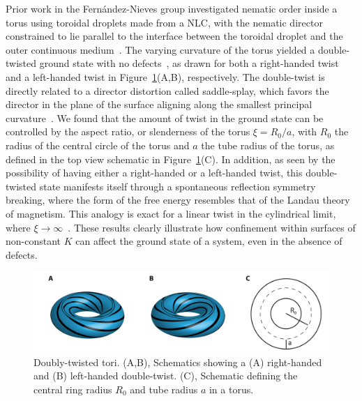Prior work in the Fern\'andez-Nieves group investigated nematic order inside a torus using toroidal droplets made from a NLC, with the nematic director constrained to lie parallel to the interface between the toroidal droplet and the outer continuous medium~\cite{RN24,RN47}.
The varying curvature of the torus yielded a double-twisted ground state with no defects~\cite{RN24}, as drawn for both a right-handed twist and a left-handed twist in Figure~\ref{f:1-Torus}(A,B), respectively.
The double-twist is directly related to a director distortion called saddle-splay, which favors the director in the plane of the surface aligning along the smallest principal curvature~\cite{RN59}.
We found that the amount of twist in the ground state can be controlled by the aspect ratio, or slenderness of the torus $\xi = R_0/a$, with $R_0$ the radius of the central circle of the torus and $a$ the tube radius of the torus, as defined in the top view schematic in Figure~\ref{f:1-Torus}(C).
In addition, as seen by the possibility of having either a right-handed or a left-handed twist, this double-twisted state manifests itself through a spontaneous reflection symmetry breaking, where the form of the free energy resembles that of the Landau theory of magnetism.
This analogy is exact for a linear twist in the cylindrical limit, where $\xi \rightarrow \infty$~\cite{RN293}.
These results clearly illustrate how confinement within surfaces of non-constant $K$ can affect the ground state of a system, even in the absence of defects.
\begin{figure}
  \centering
  \includegraphics{figures/C1/Ch1-Figs_Torus.png}
  \caption{Doubly-twisted tori.
  (A,B), Schematics showing a (A) right-handed and (B) left-handed double-twist.
  (C), Schematic defining the central ring radius $R_0$ and tube radius $a$ in a torus.}\label{f:1-Torus}
\end{figure}

